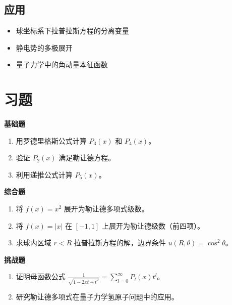 \subsection{应用}

\begin{itemize}
    \item 球坐标系下拉普拉斯方程的分离变量
    \item 静电势的多极展开
    \item 量子力学中的角动量本征函数
\end{itemize}

\section{习题}

\textbf{基础题}

\begin{enumerate}
    \item 用罗德里格斯公式计算 $P_3(x)$ 和 $P_4(x)$。
    
    \item 验证 $P_2(x)$ 满足勒让德方程。
    
    \item 利用递推公式计算 $P_5(x)$。
\end{enumerate}

\textbf{综合题}

\begin{enumerate}[resume]
    \item 将 $f(x) = x^2$ 展开为勒让德多项式级数。
    
    \item 将 $f(x) = |x|$ 在 $[-1, 1]$ 上展开为勒让德级数（前四项）。
    
    \item 求球内区域 $r < R$ 拉普拉斯方程的解，边界条件 $u(R, \theta) = \cos^2\theta$。
\end{enumerate}

\textbf{挑战题}

\begin{enumerate}[resume]
    \item 证明母函数公式 $\frac{1}{\sqrt{1-2xt+t^2}} = \sum_{l=0}^{\infty} P_l(x)t^l$。
    
    \item 研究勒让德多项式在量子力学氢原子问题中的应用。
\end{enumerate}
